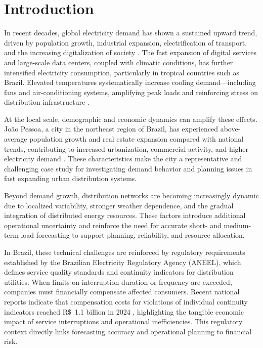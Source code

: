 \section{Introduction}
\label{intro}

In recent decades, global electricity demand has shown a sustained upward trend, driven by population growth, industrial expansion, electrification of transport, and the increasing digitalization of society \cite{IEA2025GlobalEnergyReview, McMillan2019}. The fast expansion of digital services and large-scale data centers, coupled with climatic conditions, has further intensified electricity consumption, particularly in tropical countries such as Brazil. Elevated temperatures systematically increase cooling demand—including fans and air-conditioning systems, amplifying peak loads and reinforcing stress on distribution infrastructure \cite{Goel2024, Ewim2023, Colelli2023, Bezerra2021}.

At the local scale, demographic and economic dynamics can amplify these effects. João Pessoa, a city in the northeast region of Brazil, has experienced above-average population growth and real estate expansion compared with national trends, contributing to increased urbanization, commercial activity, and higher electricity demand \cite{UNIAO2025Imoveis,FipeZAP2025JoaoPessoa}. These characteristics make the city a representative and challenging case study for investigating demand behavior and planning issues in fast expanding urban distribution systems.

Beyond demand growth, distribution networks are becoming increasingly dynamic due to localized variability, stronger weather dependence, and the gradual integration of distributed energy resources. These factors introduce additional operational uncertainty and reinforce the need for accurate short- and medium-term load forecasting to support planning, reliability, and resource allocation.

In Brazil, these technical challenges are reinforced by regulatory requirements established by the Brazilian Electricity Regulatory Agency (ANEEL), which defines service quality standards and continuity indicators for distribution utilities. When limits on interruption duration or frequency are exceeded, companies must financially compensate affected consumers. Recent national reports indicate that compensation costs for violations of individual continuity indicators reached R\$~1.1 billion in 2024 \cite{aneel_compensacoes_continuidade}, highlighting the tangible economic impact of service interruptions and operational inefficiencies. This regulatory context directly links forecasting accuracy and operational planning to financial risk.

